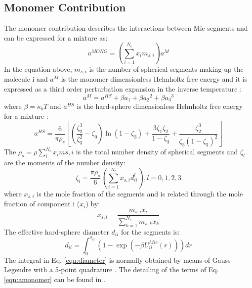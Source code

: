 \subsection{Monomer Contribution}
The monomer contribution describes the interactions between Mie segments and can be expressed for a mixture as:
\begin{equation}
a^{MONO} = \left(\sum_{i=1}^{N_{c}} x_{i}m_{s,i} \right)a^{M}
\label{eqn:amonomer}
\end{equation}
In the equation above, $m_{s,i}$ is the number of spherical segments making up the molecule i and $a^{M}$  is the monomer dimensionless Helmholtz free energy and it is expressed as a third order perturbation expansion in the inverse temperature \cite{bh1976}:
\begin{equation}
a^{M} = a^{HS}+\beta{a_{1}}+\beta{a_{2}}^2+\beta{a_{3}}^3 
\label{eqn:aM}
\end{equation}
where $\beta=\kappa_{b}T$ and $a^{HS}$ is the hard-sphere dimensionless Helmholtz free energy for a mixture :
\begin{equation}
a^{HS} = \frac{6}{\pi\rho_{s}}\left[\left(\frac{\zeta^3_2}{\zeta^2_3}-\zeta_0 \right)\ln(1-\zeta_3)+\frac{3\zeta_{1}\zeta_{2}}{1-\zeta_3}+ \frac{\zeta^3_2}{\zeta_{3}(1-\zeta_3)^2}\right]
\label{eqn:hs}
\end{equation}
The $\rho_{s}=\rho\sum_{i}^{N_c} x_{i}m{s,i}$ is the total number density of spherical segments and $\zeta_l$ are the moments of the number density:
\begin{equation}
\zeta_l = \frac{\pi\rho_s}{6}\left(\sum_{i=1}^{N_c} x_{s,i}d^l_{ii} \right), l = 0,1,2,3
\label{eqn:zetal}
\end{equation}
where $x_{s,i}$ is the mole fraction of the segments and is related through the mole fraction of component i ($x_i$) by:
\begin{equation}
x_{s,i} = \frac{m_{s,i}x_i}{\sum_{k=1}^{N_c} m_{s,k}x_{k} }
\label{eqn:xsi}
\end{equation}
The effective hard-sphere diameter $d_{ii}$ for the segments is:
\begin{equation}
d_{ii} =\int_{0}^{\sigma_{ii}} ( 1 - \exp(-\beta U^{Mie}_{ii}(r)) ) dr
\label{eqn:diameter}
\end{equation}
The integral in Eq. \eqref{eqn:diameter} is normally obtained by means of Gauss-Legendre with a 5-point quadrature \cite{papa2014}. The detailing of the terms of Eq. \eqref{eqn:amonomer} can be found in .
